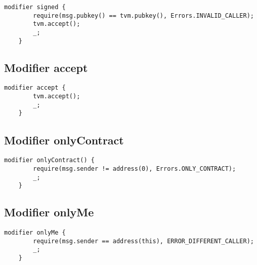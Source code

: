 \begin{lstlisting}[firstnumber=30]
    modifier signed {
        require(msg.pubkey() == tvm.pubkey(), Errors.INVALID_CALLER);
        tvm.accept();
        _;
    }
\end{lstlisting}

\subsection{Modifier accept}


\begin{lstlisting}[firstnumber=36]
    modifier accept {
        tvm.accept();
        _;
    }
\end{lstlisting}

\subsection{Modifier onlyContract}


\begin{lstlisting}[firstnumber=41]
    modifier onlyContract() {
        require(msg.sender != address(0), Errors.ONLY_CONTRACT);
        _;
    }
\end{lstlisting}

\subsection{Modifier onlyMe}


\begin{lstlisting}[firstnumber=46]
    modifier onlyMe {
        require(msg.sender == address(this), ERROR_DIFFERENT_CALLER);
        _;
    }
\end{lstlisting}
